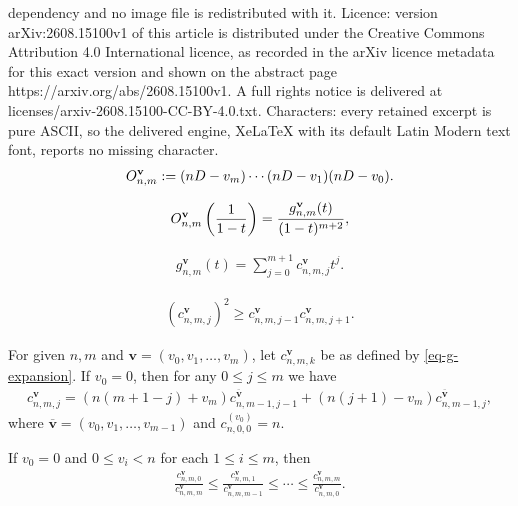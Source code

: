 \documentclass[10pt,a4paper]{amsart}
\begin{document}
dependency and no image file is redistributed with it. Licence: version arXiv:2608.15100v1 of this article is distributed under the Creative Commons Attribution 4.0 International licence, as recorded in the arXiv licence metadata for this exact version and shown on the abstract page https://arxiv.org/abs/2608.15100v1. A full rights notice is delivered at licenses/arxiv-2608.15100-CC-BY-4.0.txt. Characters: every retained excerpt is pure ASCII, so the delivered engine, XeLaTeX with its default Latin Modern text font, reports no missing character.
\begin{align}\label{eq:defi-O_nk}
O^{\bf{v}}_{n,m}:=(nD - v_m) \cdots(nD - v_1)(nD-v_0).
\end{align}

\begin{align}\label{eq:defi-fnk(x)}
O^{\bf{v}}_{n,m} \left( \frac{1}{1 - t} \right)=
\frac{g^{\bf{v}}_{n,m}(t)}{(1 - t)^{m + 2}},
\end{align}

\begin{align}\label{eq-g-expansion}
g^{\mathbf{v}}_{n,m}(t) = \sum_{j=0}^{m+1} c^{\mathbf{v}}_{n,m,j} t^j.
\end{align}

\begin{align}\label{eq-lc-coeff-gnmv}
(c^{\mathbf{v}}_{n,m,j})^2\geq c^{\mathbf{v}}_{n,m,j-1}c^{\mathbf{v}}_{n,m,j+1}.
\end{align}

\begin{lem}\label{lem-recursion}
For given $n,m$ and $\mathbf v=(v_0,v_1,\ldots,v_m)$, let $c^{\mathbf{v}}_{n,m,k}$ be as defined by \eqref{eq-g-expansion}. 
If $v_0=0$, then for any $0\le j \le m$ we have 
\begin{align}\label{eq:rec-cki}
 c^{\mathbf{v}}_{n,m,j}=(n(m+1-j)+v_m)c^{\overline{\mathbf{v}}}_{n,m-1,j-1}+(n(j+1)-v_m)c^{\overline{\mathbf{v}}}_{n,m-1,j},
\end{align}
where $\overline{\mathbf{v}}=(v_0,v_1,\ldots,v_{m-1})$ and $c^{(v_0)}_{n,0,0}=n$.
\end{lem}

\begin{thm}\label{thm-main-inequality} 
If $v_0=0$ and $0\le v_i<n$ for each $1\leq i\leq m$, then 
    \begin{align}\label{conj-1-inq-A}
        \frac{c^{\mathbf{v}}_{n,m,0}}{c^{\mathbf{v}}_{n,m,m}}\le\frac{c^{\mathbf{v}}_{n,m,1}}{c^{\mathbf{v}}_{n,m,m-1}}\le\cdots\le\frac{c^{\mathbf{v}}_{n,m,m}}{c^{\mathbf{v}}_{n,m,0}}.
    \end{align}
\end{thm}
\end{document}
